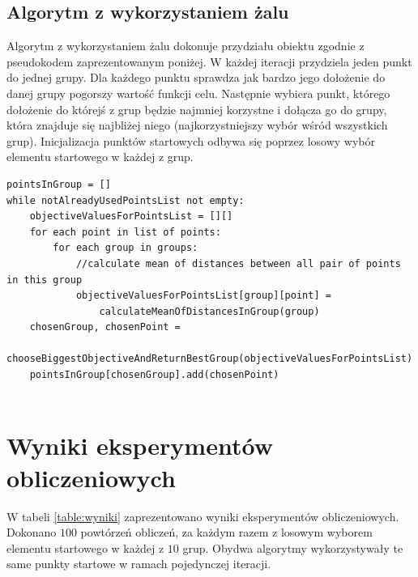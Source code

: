 \documentclass{mwart}
\begin{document}
\subsection{Algorytm z wykorzystaniem żalu}
Algorytm z wykorzystaniem żalu dokonuje przydziału obiektu zgodnie z pseudokodem zaprezentowanym poniżej. W każdej iteracji przydziela jeden punkt do jednej grupy. Dla każdego punktu sprawdza jak bardzo jego dołożenie do danej grupy pogorszy wartość funkcji celu. Następnie wybiera punkt, którego dołożenie do którejś z grup będzie najmniej korzystne i dołącza go do grupy, która znajduje się najbliżej niego (najkorzystniejszy wybór wśród wszystkich grup). Inicjalizacja punktów startowych odbywa się poprzez losowy wybór elementu startowego w każdej z grup.

\begin{lstlisting}[style=JavaStyle]
pointsInGroup = []
while notAlreadyUsedPointsList not empty:
    objectiveValuesForPointsList = [][]
    for each point in list of points:
        for each group in groups:
            //calculate mean of distances between all pair of points in this group
            objectiveValuesForPointsList[group][point] =
                calculateMeanOfDistancesInGroup(group)
    chosenGroup, chosenPoint =
        chooseBiggestObjectiveAndReturnBestGroup(objectiveValuesForPointsList)
    pointsInGroup[chosenGroup].add(chosenPoint)
        
\end{lstlisting}

\section{Wyniki eksperymentów obliczeniowych}
W tabeli \ref{table:wyniki} zaprezentowano wyniki eksperymentów obliczeniowych. Dokonano $100$ powtórzeń obliczeń, za każdym razem z losowym wyborem elementu startowego w każdej z $10$ grup. Obydwa algorytmy wykorzystywały te same punkty startowe w ramach pojedynczej iteracji.
\end{document}
